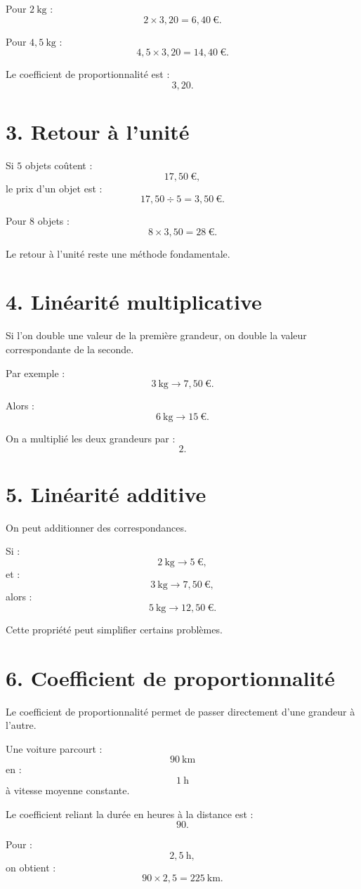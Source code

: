 Pour $2\ \text{kg}$ :
\[
2\times3{,}20=6{,}40\ \text{€}.
\]

Pour $4{,}5\ \text{kg}$ :
\[
4{,}5\times3{,}20=14{,}40\ \text{€}.
\]

Le coefficient de proportionnalité est :
\[
3{,}20.
\]

\section{3. Retour à l'unité}

Si $5$ objets coûtent :
\[
17{,}50\ \text{€},
\]
le prix d'un objet est :
\[
17{,}50\div5=3{,}50\ \text{€}.
\]

Pour $8$ objets :
\[
8\times3{,}50=28\ \text{€}.
\]

Le retour à l'unité reste une méthode fondamentale.

\section{4. Linéarité multiplicative}

Si l'on double une valeur de la première grandeur, on double la valeur correspondante de la seconde.

Par exemple :
\[
3\ \text{kg}\longrightarrow7{,}50\ \text{€}.
\]

Alors :
\[
6\ \text{kg}\longrightarrow15\ \text{€}.
\]

On a multiplié les deux grandeurs par :
\[
2.
\]

\section{5. Linéarité additive}

On peut additionner des correspondances.

Si :
\[
2\ \text{kg}\longrightarrow5\ \text{€},
\]
et :
\[
3\ \text{kg}\longrightarrow7{,}50\ \text{€},
\]
alors :
\[
5\ \text{kg}\longrightarrow12{,}50\ \text{€}.
\]

Cette propriété peut simplifier certains problèmes.

\section{6. Coefficient de proportionnalité}

Le coefficient de proportionnalité permet de passer directement d'une grandeur à l'autre.

\begin{exemple}
Une voiture parcourt :
\[
90\ \text{km}
\]
en :
\[
1\ \text{h}
\]
à vitesse moyenne constante.

Le coefficient reliant la durée en heures à la distance est :
\[
90.
\]

Pour :
\[
2{,}5\ \text{h},
\]
on obtient :
\[
90\times2{,}5=225\ \text{km}.
\]
\end{exemple}

